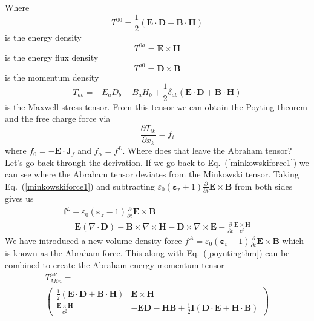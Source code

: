 Where  
\begin{equation}
T^{00} = \frac{1}{2}\left(\mathbf{E}\cdot\mathbf{D} + \mathbf{B}\cdot\mathbf{H}\right)
\label{energydensity2}
\end{equation}
is the energy density
\begin{equation}
T^{0a} = \mathbf{E}\times\mathbf{H} 
\label{energyflux2}
\end{equation}
is the energy flux density 
\begin{equation}
T^{a0} = \mathbf{D}\times\mathbf{B} 
\label{momentumdensity2}
\end{equation}
is the momentum density
\begin{equation}
T_{ab}= -E_aD_b - B_aH_b+\frac{1}{2}\delta_{ab}\left(\mathbf{E}\cdot\mathbf{D}+ \mathbf{B}\cdot\mathbf{H}\right)
\label{stresstensor4}
\end{equation}
is the Maxwell stress tensor.  From this tensor we can obtain the Poyting theorem and the free charge force via
\begin{equation}
\frac{\partial T_{ik}}{\partial x_k}=f_i
\end{equation}
where $f_0=-\mathbf{E}\cdot\mathbf{J}_f$ and $f_{\alpha}=f^L$.  Where does that leave the Abraham tensor?  Let's go back through the derivation.  If we go back to Eq.\ (\ref{minkowskiforce1}) we can see where the Abraham tensor deviates from the Minkowski tensor.  Taking Eq.\ (\ref{minkowskiforce1}) and subtracting  
$\varepsilon_0\left(\mathbf{\varepsilon_r}+1\right)\frac{\partial}{\partial t}\mathbf{E}\times\mathbf{B}$ from both sides gives us
\begin{align}
&\mathbf{f}^L +\varepsilon_0\left(\mathbf{\varepsilon_r}-1\right)\frac{\partial}{\partial t}\mathbf{E}\times\mathbf{B}& \nonumber \\&=\mathbf{E}\left(\nabla\cdot\mathbf{D}\right) -\mathbf{B}\times\nabla\times\mathbf{H}-\mathbf{D}\times\nabla\times\mathbf{E}-\frac{\partial}{\partial t}\frac{\mathbf{E}\times\mathbf{H}}{c^2}&
\label{abrahamforce1}
\end{align}
We have introduced a new volume density force $f^A=\varepsilon_0\left(\mathbf{\varepsilon_r}-1\right)\frac{\partial}{\partial t}\mathbf{E}\times\mathbf{B}$ which is known as the Abraham force.  
This along with Eq.\ (\ref{poyntingthm}) can be combined to create the Abraham energy-momentum tensor
\begin{align}
&T^{\mu\nu}_{Min} =& \nonumber \\ &\begin{pmatrix} \frac{1}{2}\left(\mathbf{E}\cdot\mathbf{D} + \mathbf{B}\cdot\mathbf{H}\right) & \mathbf{E}\times\mathbf{H} \\  \frac{\mathbf{E}\times\mathbf{H}}{c^2} & -\mathbf{E}\mathbf{D}-\mathbf{H}\mathbf{B}+\frac{1}{2}\mathbf{I}\left(\mathbf{D}\cdot\mathbf{E}+\mathbf{H}\cdot\mathbf{B}\right) \end{pmatrix}&
\label{tensor}
\end{align}
